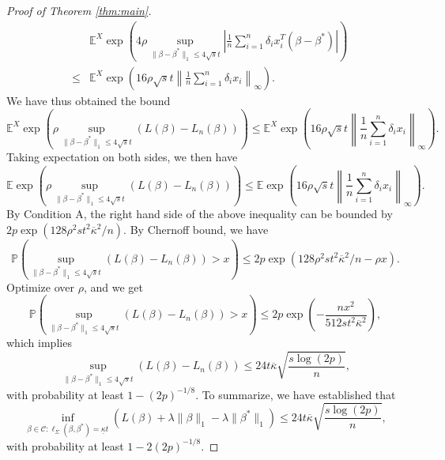 \begin{proof}[Proof of Theorem \ref{thm:main}]
\begin{eqnarray*}
&& \mathbb{E}^X\exp\left(4\rho\sup_{\|\beta-\beta^*\|_1\leq 4\sqrt{s}t}\left|\frac{1}{n}\sum_{i=1}^n\delta_ix_i^T(\beta-\beta^*)\right|\right) \\
&\leq& \mathbb{E}^X\exp\left(16\rho\sqrt{s}t \left\|\frac{1}{n}\sum_{i=1}^n\delta_ix_i\right\|_{\infty}\right).
\end{eqnarray*}
We have thus obtained the bound
\begin{equation}
\mathbb{E}^X\exp\left(\rho \sup_{\|\beta-\beta^*\|_1\leq 4\sqrt{s}t}(L(\beta)-L_n(\beta))\right)\leq  \mathbb{E}^X\exp\left(16\rho\sqrt{s}t \left\|\frac{1}{n}\sum_{i=1}^n\delta_ix_i\right\|_{\infty}\right). \label{eq:cond-mgf}
\end{equation}
Taking expectation on both sides, we then have
$$\mathbb{E}\exp\left(\rho \sup_{\|\beta-\beta^*\|_1\leq 4\sqrt{s}t}(L(\beta)-L_n(\beta))\right)\leq \mathbb{E}\exp\left(16\rho\sqrt{s}t \left\|\frac{1}{n}\sum_{i=1}^n\delta_ix_i\right\|_{\infty}\right).$$
By Condition A, the right hand side of the above inequality can be bounded by $2p\exp\left(128\rho^2s t^2\overline{\kappa}^2/n\right)$. By Chernoff bound, we have
$$\mathbb{P}\left(\sup_{\|\beta-\beta^*\|_1\leq 4\sqrt{s}t}(L(\beta)-L_n(\beta)) > x\right)\leq 2p\exp\left(128\rho^2s t^2\overline{\kappa}^2/n-\rho x\right).$$
Optimize over $\rho$, and we get
$$\mathbb{P}\left(\sup_{\|\beta-\beta^*\|_1\leq 4\sqrt{s}t}(L(\beta)-L_n(\beta)) > x\right)\leq 2p\exp\left(-\frac{nx^2}{512st^2\overline{\kappa}^2}\right),$$
which implies
$$\sup_{\|\beta-\beta^*\|_1\leq 4\sqrt{s}t}(L(\beta)-L_n(\beta))\leq 24t\overline{\kappa}\sqrt{\frac{s\log (2p)}{n}},$$
with probability at least $1-(2p)^{-1/8}$.
To summarize, we have established that
\begin{equation}
\inf_{\beta\in\mathcal{C}:\ell_{\Sigma}(\beta,\beta^*)=\underline{\kappa}t}(L(\beta)+\lambda\|\beta\|_1-\lambda\|\beta^*\|_1) \leq 24t\overline{\kappa}\sqrt{\frac{s\log (2p)}{n}}, \label{eq:pf-main-l}
\end{equation}
with probability at least $1-2(2p)^{-1/8}$.


\end{proof}
